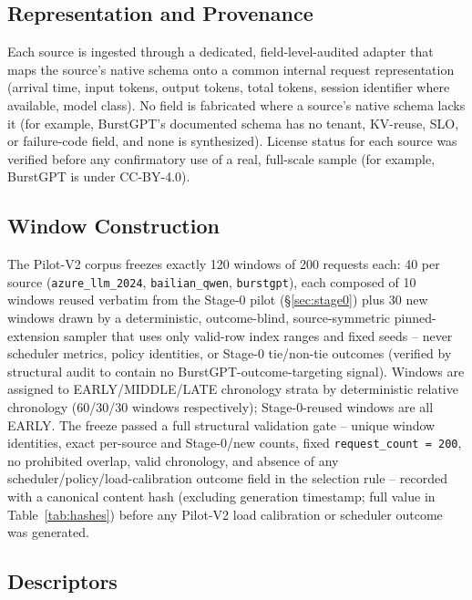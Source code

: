\documentclass[sn-basic,Numbered,pdflatex]{sn-jnl}
\begin{document}
\subsection{Representation and Provenance}
\label{sec:provenance}

Each source is ingested through a dedicated, field-level-audited adapter that maps the source's native
schema onto a common internal request representation (arrival time, input
tokens, output tokens, total tokens, session identifier where available,
model class). No field is fabricated where a source's native schema lacks
it (for example, BurstGPT's documented schema has no tenant, KV-reuse, SLO,
or failure-code field, and none is synthesized). License status for each source was verified before any confirmatory use of a real, full-scale sample (for example, BurstGPT is under CC-BY-4.0).

\subsection{Window Construction}
\label{sec:windows}

The Pilot-V2 corpus freezes exactly 120 windows of 200 requests each: 40
per source (\texttt{azure\_llm\_2024}, \texttt{bailian\_qwen},
\texttt{burstgpt}), each composed of 10 windows reused verbatim from the
Stage-0 pilot (\S\ref{sec:stage0}) plus 30 new windows drawn by a
deterministic, outcome-blind, source-symmetric pinned-extension sampler
that uses only valid-row index ranges and fixed seeds -- never scheduler
metrics, policy identities, or Stage-0 tie/non-tie outcomes (verified by
structural audit to contain no BurstGPT-outcome-targeting signal). Windows
are assigned to EARLY/MIDDLE/LATE chronology strata by deterministic
relative chronology (60/30/30 windows respectively); Stage-0-reused windows
are all EARLY. The freeze passed a full structural validation gate --
unique window identities, exact per-source and Stage-0/new counts, fixed
\texttt{request\_count = 200}, no prohibited overlap, valid chronology, and
absence of any scheduler/policy/load-calibration outcome field in the
selection rule -- recorded with a canonical content hash (excluding
generation timestamp; full value in Table~\ref{tab:hashes}) before any
Pilot-V2 load calibration or scheduler outcome was generated.

\subsection{Descriptors}
\label{sec:descriptors}
\end{document}
